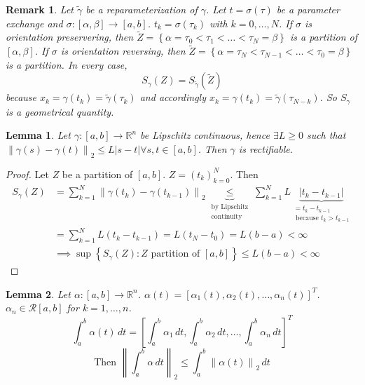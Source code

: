 \documentclass{article}
\newtheorem{lemma}{Lemma}  \numberwithin{lemma}{section}
\newtheorem{remark}{Remark}  \numberwithin{remark}{section}
\newcommand{\set}[1]{\left\{#1\right\}}
\newcommand{\norm}[1]{\left\|#1\right\|}
\newcommand{\card}[1]{\left|#1\right|}
\begin{document}
\begin{remark}
  Let $\tilde\gamma$ be a reparameterization of $\gamma$.
  Let $t = \sigma(\tau)$ be a parameter exchange and $\sigma: [\alpha, \beta] \to [a,b]$.
  $t_k = \sigma(\tau_k)$ with $k = 0, \dots, N$.
  If $\sigma$ is orientation preservering, then $\tilde Z = \set{\alpha = \tau_0 < \tau_1 < \dots < \tau_N = \beta}$ is a partition of $[\alpha, \beta]$.
  If $\sigma$ is orientation reversing, then $\tilde Z = \set{\alpha = \tau_N < \tau_{N-1} < \dots < \tau_0 = \beta}$ is a partition.
  In every case,
  \[ S_{\gamma}(Z) = S_{\tilde\gamma}(\tilde Z) \]
  because $x_k = \gamma(t_k) = \tilde\gamma(\tau_k)$ and accordingly $x_k = \gamma(t_k) = \tilde\gamma(\tau_{N-k})$.
  So $S_\gamma$ is a geometrical quantity.
\end{remark}

\begin{lemma} %
  Let $\gamma: [a, b] \to \mathbb R^n$ be Lipschitz continuous, hence $\exists L \geq 0$ such that $\norm{\gamma(s) - \gamma(t)}_2 \leq L \card{s - t} \forall s, t \in [a,b]$. Then $\gamma$ is rectifiable.
\end{lemma}

\begin{proof}
  Let $Z$ be a partition of $[a,b]$. $Z = (t_k)_{k=0}^N$. Then
  \begin{align*}
    S_{\gamma}(Z) &= \sum_{k=1}^N \norm{\gamma(t_k) - \gamma(t_{k-1})}_2 \underbrace{\leq}_{\substack{\text{by Lipschitz} \\ \text{continuity}}} \sum_{k=1}^N L \underbrace{\card{t_k - t_{k-1}}}_{\substack{= t_k - t_{k-1} \\ \text{ because } t_k > t_{k-1}}} \\
                  &= \sum_{k=1}^N L(t_k - t_{k-1}) = L(t_N - t_0) = L(b - a) < \infty \\
                  &\implies \sup\set{S_{\gamma}(Z): Z \text{ partition of } [a,b]} \leq L(b - a) < \infty
  \end{align*}
\end{proof}

\begin{lemma} %
  \label{lemma-2}
  Let $\alpha: [a,b] \to \mathbb R^n$. $\alpha(t) = \left[\alpha_1(t), \alpha_2(t), \dots, \alpha_n(t)\right]^T$.
  $\alpha_n \in \mathcal R[a,b]$ for $k = 1, \dots, n$.
  \[ \int_a^b \alpha(t) \, dt = \left[\int_a^b \alpha_1 \, dt, \int_a^b \alpha_2 \, dt, \dots, \int_a^b \alpha_n \, dt\right]^T \]
  \[ \text{Then } \norm{\int_a^b \alpha \, dt}_2 \leq \int_a^b \norm{\alpha(t)}_2 \, dt \]
\end{lemma}
\end{document}
